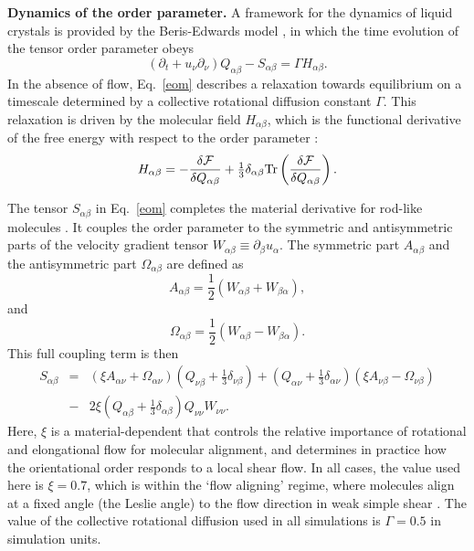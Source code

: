 \documentclass[12pt]{article}
\begin{document}
\medskip
\noindent
\textbf{Dynamics of the order parameter.}
A framework for the dynamics of liquid crystals is provided by the 
Beris-Edwards model \cite{beris}, in which the time evolution of the
tensor order parameter obeys
\begin{equation}
\label{eom}
\left(\partial_t+ u_\nu \partial_\nu \right) Q_{\alpha\beta} - S_{\alpha\beta}
= \Gamma H_{\alpha\beta}.
\end{equation}
In the absence of flow, Eq.~\ref{eom} describes a relaxation towards
equilibrium on a timescale determined by a collective rotational diffusion 
constant $\Gamma$. This relaxation is driven by the molecular field
$H_{\alpha\beta}$, which is the functional derivative of the free energy
with respect to the order parameter \cite{beris}:
\begin{equation}
H_{\alpha\beta} = -\frac{\delta {\cal F}} {\delta Q_{\alpha\beta}} 
+ {\textstyle \frac{1}{3}} \delta_{\alpha\beta} 
\mathrm{Tr}\left(\frac{\delta {\cal F}}{\delta Q_{\alpha\beta}}\right).
\end{equation}

The tensor $S_{\alpha\beta}$ in Eq.~\ref{eom} completes the material
derivative for rod-like molecules \cite{beris}. It couples the order
parameter to the symmetric and antisymmetric parts of the velocity 
gradient tensor $W_{\alpha \beta}\equiv\partial_\beta u_\alpha$.
The symmetric part $A_{\alpha\beta}$ and the antisymmetric part
$\Omega_{\alpha\beta}$ are defined as 
\begin{equation}
A_{\alpha\beta} = {\textstyle \frac{1}{2}} (W_{\alpha\beta} + W_{\beta\alpha}),
\end{equation}
and
\begin{equation}
\Omega_{\alpha\beta} = {\textstyle \frac{1}{2}} (W_{\alpha\beta} - W_{\beta\alpha}).
\end{equation}
This full coupling term is then
\begin{eqnarray}
\label{coupling-term}
S_{\alpha\beta}  &=&
(\xi A_{\alpha\nu} + \Omega_{\alpha\nu})
(Q_{\nu\beta} + {\textstyle \frac{1}{3}}\delta_{\nu\beta})
+
(Q_{\alpha\nu} + {\textstyle \frac{1}{3}} \delta_{\alpha\nu})
(\xi A_{\nu\beta} - \Omega_{\nu\beta})
\nonumber\\ 
&-&2 \xi ({Q_{\alpha\beta} + {\textstyle \frac{1}{3}}\delta_{\alpha\beta}})
Q_{\nu\nu} W_{\nu\nu}.
\end{eqnarray}
Here, $\xi$ is a material-dependent that controls the
relative importance of rotational and elongational flow for molecular
alignment, and determines in practice how the orientational order
responds to a local shear flow. 
In all cases, the value used here is $\xi = 0.7$, which is within
the `flow aligning' regime, where molecules align at a fixed angle
(the Leslie angle) to the flow direction in weak simple shear \cite{deGennes}.
The value of the collective rotational diffusion used in all simulations is
$\Gamma = 0.5$ in simulation units.
\end{document}

